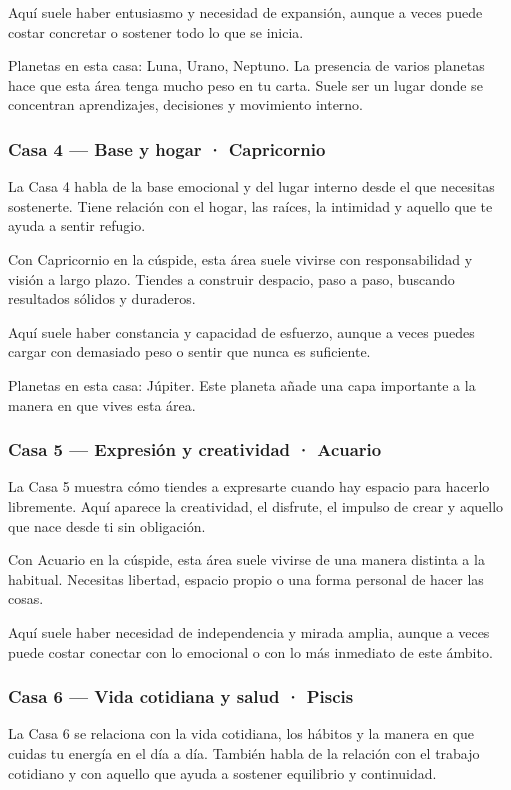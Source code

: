 \documentclass[11pt,a4paper]{article}
\begin{document}
Aquí suele haber entusiasmo y necesidad de expansión, aunque a veces puede costar concretar o sostener todo lo que se inicia.

Planetas en esta casa: Luna, Urano, Neptuno. La presencia de varios planetas hace que esta área tenga mucho peso en tu carta. Suele ser un lugar donde se concentran aprendizajes, decisiones y movimiento interno.

\subsubsection*{Casa 4 — Base y hogar · Capricornio}
La Casa 4 habla de la base emocional y del lugar interno desde el que necesitas sostenerte. Tiene relación con el hogar, las raíces, la intimidad y aquello que te ayuda a sentir refugio.

Con Capricornio en la cúspide, esta área suele vivirse con responsabilidad y visión a largo plazo. Tiendes a construir despacio, paso a paso, buscando resultados sólidos y duraderos.

Aquí suele haber constancia y capacidad de esfuerzo, aunque a veces puedes cargar con demasiado peso o sentir que nunca es suficiente.

Planetas en esta casa: Júpiter. Este planeta añade una capa importante a la manera en que vives esta área.

\subsubsection*{Casa 5 — Expresión y creatividad · Acuario}
La Casa 5 muestra cómo tiendes a expresarte cuando hay espacio para hacerlo libremente. Aquí aparece la creatividad, el disfrute, el impulso de crear y aquello que nace desde ti sin obligación.

Con Acuario en la cúspide, esta área suele vivirse de una manera distinta a la habitual. Necesitas libertad, espacio propio o una forma personal de hacer las cosas.

Aquí suele haber necesidad de independencia y mirada amplia, aunque a veces puede costar conectar con lo emocional o con lo más inmediato de este ámbito.

\subsubsection*{Casa 6 — Vida cotidiana y salud · Piscis}
La Casa 6 se relaciona con la vida cotidiana, los hábitos y la manera en que cuidas tu energía en el día a día. También habla de la relación con el trabajo cotidiano y con aquello que ayuda a sostener equilibrio y continuidad.
\end{document}
